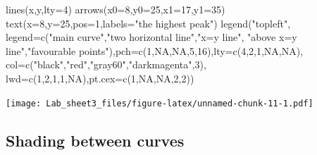 \documentclass[
]{article}
\newenvironment{Shaded}{\begin{snugshade}}{\end{snugshade}}
\newcommand{\AttributeTok}[1]{\textcolor[rgb]{0.77,0.63,0.00}{#1}}
\newcommand{\ConstantTok}[1]{\textcolor[rgb]{0.00,0.00,0.00}{#1}}
\newcommand{\DecValTok}[1]{\textcolor[rgb]{0.00,0.00,0.81}{#1}}
\newcommand{\FunctionTok}[1]{\textcolor[rgb]{0.00,0.00,0.00}{#1}}
\newcommand{\NormalTok}[1]{#1}
\newcommand{\StringTok}[1]{\textcolor[rgb]{0.31,0.60,0.02}{#1}}
\theoremstyle{remark}
\begin{document}
\begin{Shaded}
\begin{Highlighting}[]
\FunctionTok{lines}\NormalTok{(x,y,}\AttributeTok{lty=}\DecValTok{4}\NormalTok{)}
\FunctionTok{arrows}\NormalTok{(}\AttributeTok{x0=}\DecValTok{8}\NormalTok{,}\AttributeTok{y0=}\DecValTok{25}\NormalTok{,}\AttributeTok{x1=}\DecValTok{17}\NormalTok{,}\AttributeTok{y1=}\DecValTok{35}\NormalTok{)}
\FunctionTok{text}\NormalTok{(}\AttributeTok{x=}\DecValTok{8}\NormalTok{,}\AttributeTok{y=}\DecValTok{25}\NormalTok{,}\AttributeTok{pos=}\DecValTok{1}\NormalTok{,}\AttributeTok{labels=}\StringTok{"the highest peak"}\NormalTok{)}
\FunctionTok{legend}\NormalTok{(}\StringTok{"topleft"}\NormalTok{,}
\AttributeTok{legend=}\FunctionTok{c}\NormalTok{(}\StringTok{"main curve"}\NormalTok{,}\StringTok{"two horizontal line"}\NormalTok{,}\StringTok{"x=y line"}\NormalTok{,}
\StringTok{"above x=y line"}\NormalTok{,}\StringTok{"favourable points"}\NormalTok{),}\AttributeTok{pch=}\FunctionTok{c}\NormalTok{(}\DecValTok{1}\NormalTok{,}\ConstantTok{NA}\NormalTok{,}\ConstantTok{NA}\NormalTok{,}\DecValTok{5}\NormalTok{,}\DecValTok{16}\NormalTok{),}\AttributeTok{lty=}\FunctionTok{c}\NormalTok{(}\DecValTok{4}\NormalTok{,}\DecValTok{2}\NormalTok{,}\DecValTok{1}\NormalTok{,}\ConstantTok{NA}\NormalTok{,}\ConstantTok{NA}\NormalTok{),}
\AttributeTok{col=}\FunctionTok{c}\NormalTok{(}\StringTok{"black"}\NormalTok{,}\StringTok{"red"}\NormalTok{,}\StringTok{"gray60"}\NormalTok{,}\StringTok{"darkmagenta"}\NormalTok{,}\DecValTok{3}\NormalTok{),}
\AttributeTok{lwd=}\FunctionTok{c}\NormalTok{(}\DecValTok{1}\NormalTok{,}\DecValTok{2}\NormalTok{,}\DecValTok{1}\NormalTok{,}\DecValTok{1}\NormalTok{,}\ConstantTok{NA}\NormalTok{),}\AttributeTok{pt.cex=}\FunctionTok{c}\NormalTok{(}\DecValTok{1}\NormalTok{,}\ConstantTok{NA}\NormalTok{,}\ConstantTok{NA}\NormalTok{,}\DecValTok{2}\NormalTok{,}\DecValTok{2}\NormalTok{))}
\end{Highlighting}
\end{Shaded}

\texttt{[image: Lab\_sheet3\_files/figure-latex/unnamed-chunk-11-1.pdf]}

\hypertarget{shading-between-curves}{%
\subsection{Shading between curves}\label{shading-between-curves}}
\end{document}
